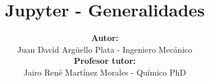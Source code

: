 \documentclass[20]{beamer}
\title[ACMA]{\textbf{Jupyter - Generalidades}}
\author[Juan David]{
\textbf{Autor:}\\
Juan David Argüello Plata - Ingeniero Mecánico\\
\vspace{5pt}
\textbf{Profesor tutor:}\\
Jairo René Martínez Morales - Químico PhD
}
\institute[]{
	CENIVAM\\
	Universidad Industrial de Santander
}
\date{}
\begin{document}
\begin{frame}
\titlepage
\end{frame}










\end{document}
